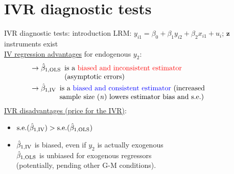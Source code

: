 \documentclass[usenames,dvipsnames]{beamer}
\begin{document}
\section{IVR diagnostic tests}
\begin{frame}{IVR diagnostic tests: introduction}
LRM: $y_{i1}=\beta_0+\beta_1 y_{i2}+\beta_2 x_{i1}+u_i$; \quad $\bm{z}$ instruments exist \\
\vspace{0.3cm}
\underline{IV regression advantages} for endogenous $y_2$:
\vspace{-0.2cm}
\begin{align*}
& \rightarrow \hat{\beta}_{1,\textnormal{OLS}} \enspace \parbox[t]{24em}{ is a \textcolor{red}{biased and inconsistent estimator} \\(asymptotic errors)}\\
 & \rightarrow \hat{\beta}_{1, \textnormal{IV}} \enspace \parbox[t]{24em}{ is a \textcolor{blue}{biased and consistent estimator} (increased \\sample size (\textit{n}) lowers estimator bias and s.e.)} 
\end{align*}
\underline{IVR disadvantages (price for the IVR)}:
\begin{itemize}
\item $\textnormal{s.e.}(\hat{\beta}_{1, \textnormal{IV}}) > \textnormal{s.e.}(\hat{\beta}_{1,\textnormal{OLS}})$
\item $\hat{\beta}_{1, \textnormal{IV}}$ is biased, even if $y_2$ is actually exogenous\\
\smallskip
$\hat{\beta}_{1, \textnormal{OLS}}$ is unbiased for exogenous regressors \\ 
\small (potentially, pending other G-M conditions).
\end{itemize}
\end{frame}
\end{document}
